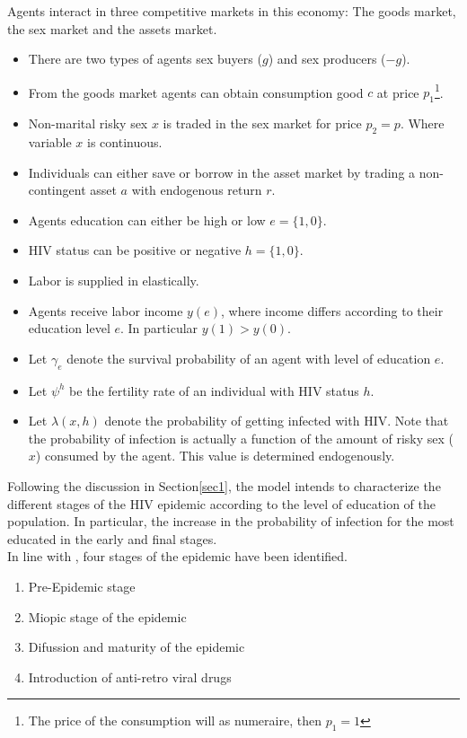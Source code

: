  Agents interact in three competitive markets in this economy: The goods market, the sex market and the assets market.  
\begin{itemize}
\item There are two types of agents sex buyers ($g$) and sex producers ($-g$).  
\item From the goods market agents can obtain consumption good $c$ at price $p_{1}$\footnote{The price of the consumption will as numeraire, then $p_{1}=1$}. 
\item Non-marital risky sex $x$ is traded in the sex market for price $p_{2}=p$. Where variable $x$ is continuous.
\item Individuals can either save or borrow in the asset market by trading a non-contingent asset $a$ with endogenous return $r$.
\item Agents education can either be high or low $e=\{1,0\}$.
\item HIV status can be positive or negative $h=\{1,0\}$.
\item Labor is supplied in elastically.
\item Agents receive labor income $y(e)$, where income differs according to their education level $e$. In particular $y(1)>y(0)$.
\item Let $\gamma_{e}$ denote the survival probability of an agent with level of education $e$.
\item Let $\psi^{h}$ be the fertility rate of an individual with HIV status $h$.
\item Let $\lambda(x,h)$ denote the probability of getting infected with HIV. Note that the probability of infection is actually a function of the amount of risky sex ($x$) consumed by the agent. This value is determined endogenously.
\end{itemize}
Following the discussion in Section\ref{sec1}, the model intends to characterize the different stages of the HIV epidemic according to the level of education of the population. In particular, the increase in the probability of infection for the most educated in the early and final stages.\\
In line with \cite{raul}, four stages of the epidemic have been identified. 
\begin{enumerate}
\item Pre-Epidemic stage
\item Miopic stage of the epidemic
\item Difussion and maturity of the epidemic
\item Introduction of anti-retro viral drugs
\end{enumerate}
\begin{comment}
The features of each stage will be described in detail in the upcoming sections.\\

The model features additional dynamics, in the sense that it intends to capture the evolution of the HIV epidemic starting from stage one until stage four. For presentation purposes each stage characterizes a stationary equilibrium, but later on they will be linked with the intention to describe the complete evolution of the HIV epidemic.
\end{comment}


